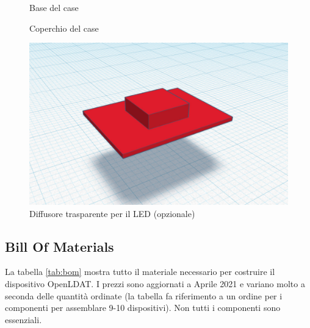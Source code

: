 \begin{figure}[H]
	\centering
	\caption{Base del case}
	\label{fig:case_base}
\end{figure}
\begin{figure}[H]
	\centering
	
	\vspace{0.5cm}
	
	\caption{Coperchio del case}
	\label{fig:case_top}
\end{figure}
\begin{figure}[H]
	\centering
	\includegraphics[width=\textwidth]{Dispositivo_files/openldat_case_ledcover.jpg}
	\caption{Diffusore trasparente per il LED (opzionale)}
	\label{fig:case_ledcover}
\end{figure}

\subsection{Bill Of Materials}
La tabella \ref{tab:bom} mostra tutto il materiale necessario per costruire il dispositivo OpenLDAT. I prezzi sono aggiornati a Aprile 2021 e variano molto a seconda delle quantità ordinate (la tabella fa riferimento a un ordine per i componenti per assemblare 9-10 dispositivi). Non tutti i componenti sono essenziali.

